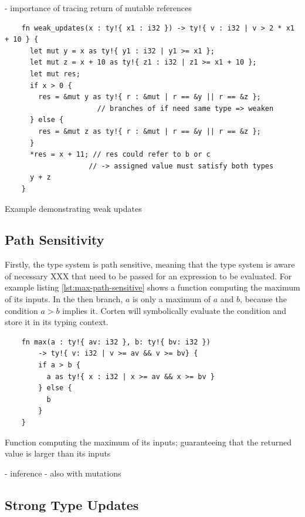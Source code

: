 \documentclass{book}
\theoremstyle{definition}
\begin{document}
- importance of tracing return of mutable references



\begin{listing}[ht]
  \begin{verbatim}
    fn weak_updates(x : ty!{ x1 : i32 }) -> ty!{ v : i32 | v > 2 * x1 + 10 } {
      let mut y = x as ty!{ y1 : i32 | y1 >= x1 };
      let mut z = x + 10 as ty!{ z1 : i32 | z1 >= x1 + 10 };
      let mut res;
      if x > 0 {
        res = &mut y as ty!{ r : &mut | r == &y || r == &z };
                      // branches of if need same type => weaken
      } else {
        res = &mut z as ty!{ r : &mut | r == &y || r == &z };
      }
      *res = x + 11; // res could refer to b or c 
                    // -> assigned value must satisfy both types
      y + z
    }
  \end{verbatim}
  \caption{Example demonstrating weak updates}
  \label{lst:mutation-weak}
\end{listing}

\label{subsec:path-sensitivify}\subsection{Path Sensitivity}

Firstly, the type system is path sensitive, meaning that the type system is aware of necessary XXX that need to be passed for an expression to be evaluated. For example listing \ref{lst:max-path-sensitive} shows a function computing the maximum of its inputs. In the then branch, $a$ is only a maximum of $a$ and $b$, because the condition $a > b$ implies it. Corten will symbolically evaluate the condition and store it in its typing context.

\begin{listing}[ht]
  \begin{verbatim}
    fn max(a : ty!{ av: i32 }, b: ty!{ bv: i32 })
        -> ty!{ v: i32 | v >= av && v >= bv} {
        if a > b {
          a as ty!{ x : i32 | x >= av && x >= bv }
        } else {
          b
        }
    }
  \end{verbatim}
  \caption{Function computing the maximum of its inputs; guaranteeing that the returned value is larger than its inputs}
  \label{lst:max-path-sensitive}
\end{listing}


- inference
- also with mutations


\label{subsec:strong-type-updates}\subsection{Strong Type Updates}
\end{document}
